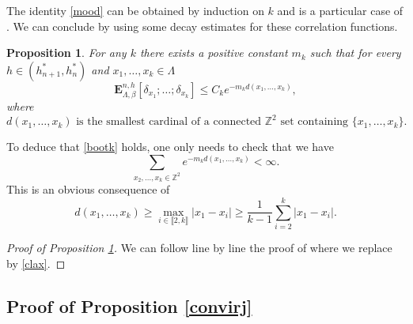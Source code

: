 \documentclass[10pt]{amsart}
\numberwithin{equation}{section}
\theoremstyle{plain}
\newtheorem{proposition}[theorem]{Proposition}
\theoremstyle{definition}
\newcommand{\lint}{\llbracket}
\newcommand{\rint}{\rrbracket}
\newcommand{\bE}{{\ensuremath{\mathbf E}} }
\newcommand{\bbZ}{{\ensuremath{\mathbb Z}} }
\newcommand{\gb}{\beta}
\newcommand{\gL}{\Lambda}
\begin{document}
The identity \eqref{mood} can be obtained by induction on $k$ and is a particular case of \cite[Eq.\,(1.9)]{cf:vDK}.
We can conclude by using some decay estimates for these correlation functions.

\begin{proposition}\label{mickey}
For any $k$ there exists a positive constant $m_k$ such that for every $h\in (h^*_{n+1},h^*_n)$ and $x_1,\dots,x_k\in \gL$
\begin{equation*}
\bE^{n,h}_{\gL,\gb}\left[ \delta_{x_1} ;\dots ;\delta_{x_k} \right]\le C_k e^{-m_k d(x_1,\dots,x_k)},
\end{equation*}
where
\[
d(x_1,\dots,x_k)\text{ is the smallest cardinal of a connected $\bbZ^2$ set containing $\{x_1,\dots,x_k\}$.}
\]
\end{proposition}
To deduce that \eqref{bootk} holds, one only needs to check that we have
\begin{equation*}
\sum_{x_2,\dots,x_k\in \bbZ^2} e^{-m_k d(x_1,\dots,x_k)}<\infty.
\end{equation*}
This is an obvious consequence of
\begin{equation*}
d(x_1,\dots,x_k)\ge \max_{i\in \lint 2,k\rint} |x_1-x_i|\ge \frac{1}{k-1} \sum_{i=2}^k |x_1-x_i|.
\end{equation*}
\begin{proof}[Proof of Proposition \ref{mickey}]
We can follow line by line the proof of \cite[Lem.\,3.1]{cf:vDK} where we replace \cite[Ass.\,(3.2)]{cf:vDK} by \eqref{clax}.
\end{proof}

\subsection{Proof of Proposition \ref{convirj}}\label{lapriv}
\end{document}
